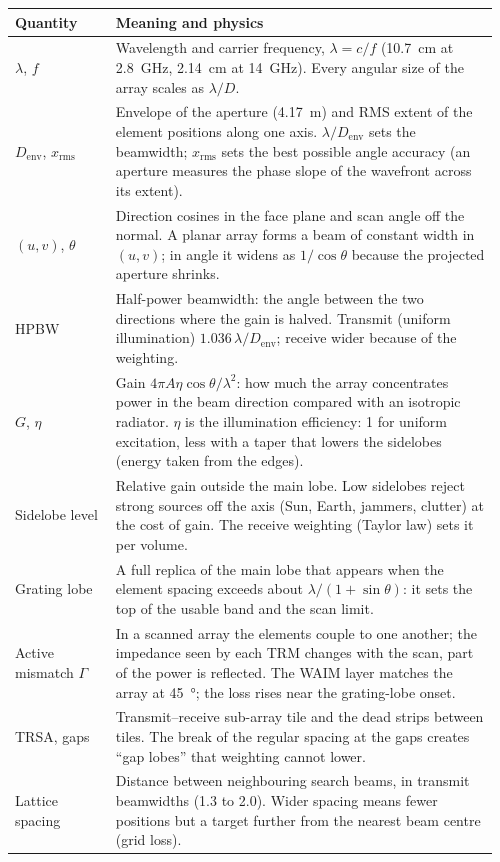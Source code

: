 \documentclass[11pt,a4paper]{article}
\newcommand{\Denv}{D_{\mathrm{env}}}
\begin{document}
{\small
\begin{longtable}{@{}p{0.2\linewidth}p{0.76\linewidth}@{}}
\toprule
Quantity & Meaning and physics\\
\midrule
\endhead
$\lambda$, $f$ & Wavelength and carrier frequency, $\lambda = c/f$ (\SI{10.7}{cm} at \SI{2.8}{GHz}, \SI{2.14}{cm} at
\SI{14}{GHz}). Every angular size of the array scales as $\lambda/D$.\\
$\Denv$, $x_{\mathrm{rms}}$ & Envelope of the aperture (\SI{4.17}{m}) and RMS extent of the element positions along one
axis. $\lambda/\Denv$ sets the beamwidth; $x_{\mathrm{rms}}$ sets the best possible angle accuracy (an aperture
measures the phase slope of the wavefront across its extent).\\
$(u, v)$, $\theta$ & Direction cosines in the face plane and scan angle off the normal. A planar array forms a beam of
constant width in $(u,v)$; in angle it widens as $1/\cos\theta$ because the projected aperture shrinks.\\
HPBW & Half-power beamwidth: the angle between the two directions where the gain is halved. Transmit (uniform
illumination) $1.036\,\lambda/\Denv$; receive wider because of the weighting.\\
$G$, $\eta$ & Gain $4\pi A\eta\cos\theta/\lambda^2$: how much the array concentrates power in the beam direction
compared with an isotropic radiator. $\eta$ is the illumination efficiency: 1 for uniform excitation, less with a
taper that lowers the sidelobes (energy taken from the edges).\\
Sidelobe level & Relative gain outside the main lobe. Low sidelobes reject strong sources off the axis (Sun, Earth,
jammers, clutter) at the cost of gain. The receive weighting (Taylor law) sets it per volume.\\
Grating lobe & A full replica of the main lobe that appears when the element spacing exceeds about $\lambda/(1+\sin\theta)$:
it sets the top of the usable band and the scan limit.\\
Active mismatch $\Gamma$ & In a scanned array the elements couple to one another; the impedance seen by each TRM changes
with the scan, part of the power is reflected. The WAIM layer matches the array at \SI{45}{\degree}; the loss rises
near the grating-lobe onset.\\
TRSA, gaps & Transmit--receive sub-array tile and the dead strips between tiles. The break of the regular spacing at the
gaps creates ``gap lobes'' that weighting cannot lower.\\
Lattice spacing & Distance between neighbouring search beams, in transmit beamwidths (1.3 to 2.0). Wider spacing means
fewer positions but a target further from the nearest beam centre (grid loss).\\
\bottomrule
\end{longtable}}
\end{document}
